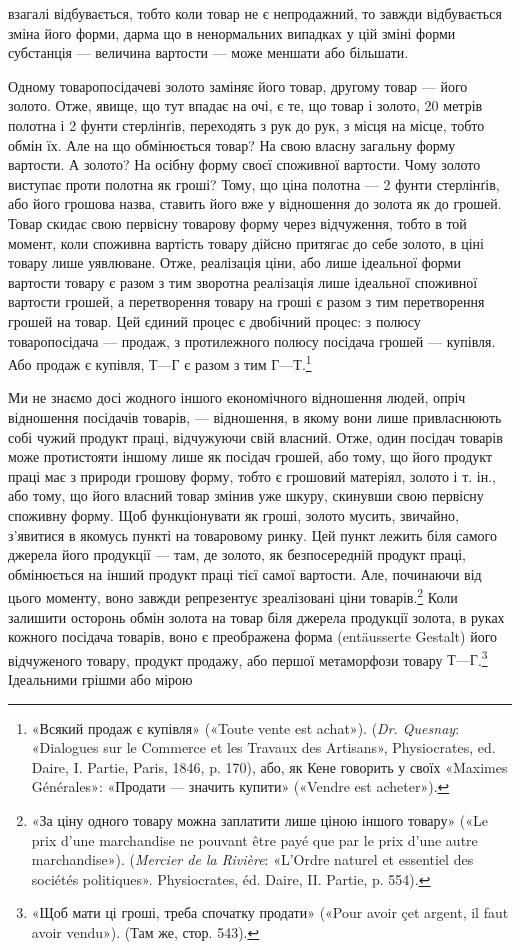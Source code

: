 \parcont{}  %
взагалі відбувається, тобто коли товар не є непродажний, то
завжди відбувається зміна його форми, дарма що в ненормальних
випадках у цій зміні форми субстанція — величина вартости —
може меншати або більшати.

Одному товаропосідачеві золото заміняє його товар, другому
товар — його золото. Отже, явище, що тут впадає на очі, є те, що
товар і золото, 20 метрів полотна і 2 фунти стерлінґів, переходять
з рук до рук, з місця на місце, тобто обмін їх. Але на що обмінюється
товар? На свою власну загальну форму вартости. А золото?
На осібну форму своєї споживної вартости. Чому золото
виступає проти полотна як гроші? Тому, що ціна полотна —
2 фунти стерлінґів, або його грошова назва, ставить його вже у
відношення до золота як до грошей. Товар скидає свою первісну
товарову форму через відчуження, тобто в той момент, коли споживна
вартість товару дійсно притягає до себе золото, в ціні товару
лише уявлюване. Отже, реалізація ціни, або лише ідеальної форми
вартости товару є разом з тим зворотна реалізація лише ідеальної
споживної вартости грошей, а перетворення товару на гроші є
разом з тим перетворення грошей на товар. Цей єдиний процес
є двобічний процес: з полюсу товаропосідача — продаж, з протилежного
полюсу посідача грошей — купівля. Або продаж є купівля,
$Т — Г$ є разом з тим $Г — Т$.\footnote{
«Всякий продаж є купівля» («Toute vente est achat»). (\emph{Dr. Quesnay}:
«Dialogues sur le Commerce et les Travaux des Artisans», Physiocrates,
ed. Daire, I. Partie, Paris, 1846, p. 170), або, як Кене говорить у своїх
«Maximes Générales»: «Продати — значить купити» («Vendre est acheter»).
}

Ми не знаємо досі жодного іншого економічного відношення
людей, опріч відношення посідачів товарів, — відношення, в
якому вони лише привласнюють собі чужий продукт праці, відчужуючи
свій власний. Отже, один посідач товарів може протистояти
іншому лише як посідач грошей, або тому, що його продукт
праці має з природи грошову форму, тобто є грошовий матеріял,
золото і т. ін., або тому, що його власний товар змінив уже
шкуру, скинувши свою первісну споживну форму. Щоб функціонувати
як гроші, золото мусить, звичайно, з’явитися в якомусь
пункті на товаровому ринку. Цей пункт лежить біля самого
джерела його продукції — там, де золото, як безпосередній продукт
праці, обмінюється на інший продукт праці тієї самої вартости.
Але, починаючи від цього моменту, воно завжди репрезентує
зреалізовані ціни товарів.\footnote{
«За ціну одного товару можна заплатити лише ціною іншого товару»
(«Le prix d’une marchandise ne pouvant être payé que par le prix
d’une autre marchandise»). (\emph{Mercier de la Rivière}: «L’Ordre naturel et
essentiel des sociétés politiques». Physiocrates, éd. Daire, II. Partie, p. 554).
} Коли залишити осторонь
обмін золота на товар біля джерела продукції золота, в руках
кожного посідача товарів, воно є преображена форма (entäusserte
Gestalt) його відчуженого товару, продукт продажу, або першої
метаморфози товару $Т — Г$.\footnote{
«Щоб мати ці гроші, треба спочатку продати» («Pour avoir çet
argent, il faut avoir vendu»). (Там же, стор. 543).
} Ідеальними грішми або мірою
\parbreak{}  %
